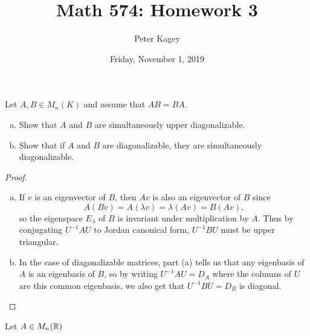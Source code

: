 \documentclass{article}
\begin{document}
\title{Math 574: Homework 3}
\author{Peter Kagey}
\date{Friday, November 1, 2019}

\maketitle

\begin{problem}{1} Let $A, B \in M_n(K)$ and assume that $AB = BA$.
  \begin{enumerate}[(a)]
    \item Show that $A$ and $B$ are simultaneously upper diagonalizable.
    \item Show that if $A$ and $B$ are diagonalizable, they are simultaneously
      diagonalizable.
  \end{enumerate}
\end{problem}

\begin{proof} ~ %
  \begin{enumerate}[(a)]
    \item If $v$ is an eigenvector of $B$, then $Av$ is also an eigenvector of $B$
    since \[
      A(Bv) = A(\lambda v) = \lambda(Av) = B(Av),
    \] so the eigenspace $E_\lambda$ of $B$ is invariant under multiplication
    by $A$. Thus by conjugating $U^{-1}AU$ to Jordan canonical form, $U^{-1}BU$
    must be upper triangular.
    \item In the case of diagonalizable matrices, part (a) tells us that any
    eigenbasis of $A$ is an eigenbasis of $B$, so
    by writing $U^{-1}AU = D_A$ where the columns of $U$ are this common
    eigenbasis, we also get that $U^{-1}BU = D_B$ is diagonal.

  \end{enumerate}
\end{proof}
\begin{problem}{2} Let $A \in M_n(\mathbb R)$
\end{problem}
\end{document}
